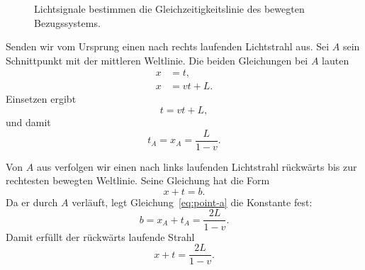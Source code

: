\begin{figure}[H]
\centering
{}
\caption{Lichtsignale bestimmen die Gleichzeitigkeitslinie des bewegten Bezugssystems.}
\end{figure}

Senden wir vom Ursprung einen nach rechts laufenden Lichtstrahl aus. Sei \(A\) sein Schnittpunkt mit der mittleren Weltlinie. Die beiden Gleichungen bei \(A\) lauten
\begin{align}
x&=t,\\
x&=vt+L.
\end{align}
Einsetzen ergibt
\begin{equation}
t=vt+L,
\end{equation}
und damit
\begin{equation}
t_A=x_A=\frac{L}{1-v}.
\label{eq:point-a}
\end{equation}

Von \(A\) aus verfolgen wir einen nach links laufenden Lichtstrahl rückwärts bis zur rechtesten bewegten Weltlinie. Seine Gleichung hat die Form
\begin{equation}
x+t=b.
\end{equation}
Da er durch \(A\) verläuft, legt Gleichung~\eqref{eq:point-a} die Konstante fest:
\begin{equation}
b=x_A+t_A=\frac{2L}{1-v}.
\end{equation}
Damit erfüllt der rückwärts laufende Strahl
\begin{equation}
x+t=\frac{2L}{1-v}.
\label{eq:backward-ray}
\end{equation}

